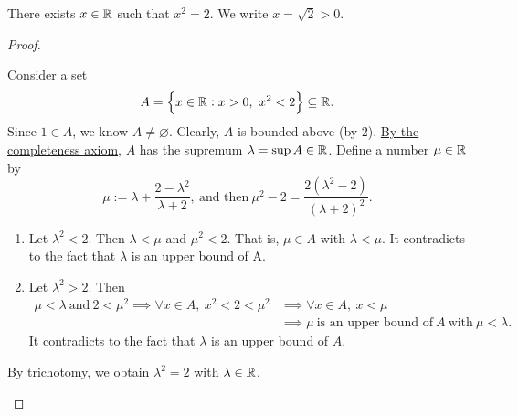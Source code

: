\documentclass[11pt,openany]{article}
\begin{document}
\vfill
\begin{note}
	There exists $x\in\mathbb{R}$ such that $x^2=2$. We write $x=\sqrt{2}>0$.
	\begin{proof}
		\textcolor{gray!50}{Consider a set \[
		A=\set{x\in\R:x>0,\ x^2<2}\subseteq\R.
		\] Since $1\in A$, we know $A\neq\varnothing$. Clearly, $A$ is bounded above (by 2). \underline{By the completeness axiom}, $A$ has the supremum $\lambda=\sup A\in\mathbb{R}$.
		Define a number $\mu\in\mathbb{R}$ by\[
		\mu:=\lambda+\frac{2-\lambda^2}{\lambda+2},\ \text{and then}\ \mu^2-2=\frac{2(\lambda^2-2)}{(\lambda+2)^2}.
		\] \begin{enumerate}
			\item Let $\lambda^2<2$. Then $\lambda <\mu$ and $\mu^2<2$. That is, $\mu\in A$ with $\lambda <\mu$.
			It contradicts to the fact that $\lambda$ is an upper bound of A.
			\item Let $\lambda^2>2$. Then \begin{align*}
				\mu<\lambda\ \text{and}\ 2 < \mu^2 \implies \forall x\in A,\ x^2<2<\mu^2
				&\implies \forall x\in A,\ x<\mu\\
				&\implies \mu\ \text{is an upper bound of}\ A\ \text{with}\ \mu <\lambda.
			\end{align*} It contradicts to the fact that $\lambda$ is an upper bound of $A$.
		\end{enumerate} By trichotomy, we obtain $\lambda^2=2$ with $\lambda\in\mathbb{R}$.}
	\end{proof}
\end{note}
\newpage
{}
\end{document}
